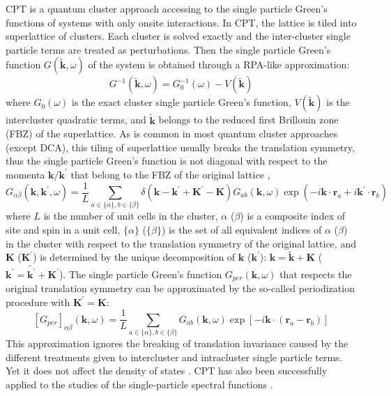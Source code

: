 \documentclass[12pt]{iopart}
\begin{document}
\par CPT \cite{SPP_PRL2000} is a quantum cluster approach accessing to the single particle Green's functions of systems with only onsite interactions. In CPT, the lattice is tiled into superlattice of clusters. Each cluster is solved exactly and the inter-cluster single particle terms are treated as perturbations. Then the single particle Green's function $G(\widetilde{\mathbf{k}},\omega)$ of the system is obtained through a RPA-like approximation:
\begin{equation}\label{SPGF}
  G^{-1}(\widetilde{\mathbf{k}},\omega)=G_0^{-1}(\omega)-V(\widetilde{\mathbf{k}})
\end{equation}
where $G_0(\omega)$ is the exact cluster single particle Green's function, $V(\widetilde{\mathbf{k}})$ is the intercluster quadratic terms, and $\widetilde{\mathbf{k}}$ belongs to the reduced first Brillouin zone (FBZ) of the superlattice. As is common in most quantum cluster approaches (except DCA), this tiling of superlattice usually breaks the translation symmetry, thus the single particle Green's function is not diagonal with respect to the momenta $\mathbf{k}$/$\mathbf{k}^\prime$ that belong to the FBZ of the original lattice \cite{S_arXiv2008},
\begin{equation}\label{FT}
G_{\alpha\beta}(\mathbf{k},\mathbf{k}^\prime,\omega)=\frac{1}{L}\sum_{a\in\{\alpha\},b\in\{\beta\}}
\delta(\mathbf{k}-\mathbf{k}^\prime+\mathbf{K}^\prime-\mathbf{K}) G_{ab}(\mathbf{k},\omega) \exp\left(-i\mathbf{k}\cdot\mathbf{r}_a+i\mathbf{k}^\prime\cdot\mathbf{r}_b\right)
\end{equation}
where $L$ is the number of unit cells in the cluster, $\alpha$ ($\beta$) is a composite index of site and spin in a unit cell, $\{\alpha\}$ ($\{\beta\}$) is the set of all equivalent indices of $\alpha$ ($\beta$) in the cluster with respect to the translation symmetry of the original lattice, and $\mathbf{K}$ ($\mathbf{K}^\prime$) is determined by the unique decomposition of $\mathbf{k}$ ($\mathbf{k}^\prime$): $\mathbf{k}=\widetilde{\mathbf{k}}+\mathbf{K}$ ($\mathbf{k}^\prime=\widetilde{\mathbf{k}^\prime}+\mathbf{K}^\prime$). The single particle Green's function $G_{per}(\mathbf{k},\omega)$ that respects the original translation symmetry can be approximated by the so-called periodization procedure with $\mathbf{K}^\prime=\mathbf{K}$:
\begin{equation}\label{PP}
\left[G_{per}\right]_{\alpha\beta}(\mathbf{k},\omega)=
\frac{1}{L}\sum_{a\in\{\alpha\},b\in\{\beta\}}G_{ab}(\mathbf{k},\omega)\exp\left[-i \mathbf{k}\cdot(\mathbf{r}_a-\mathbf{r}_b)\right]
\end{equation}
This approximation ignores the breaking of translation invariance caused by the different treatments given to intercluster and intracluster single particle terms. Yet it does not affect the density of states \cite{S_arXiv2008}. CPT has also been successfully applied to the studies of the single-particle spectral functions \cite{SPP_PRL2000,ST_PRL2004,KYXL_PRB2011,YXL_PRL2011,YL_PRB2012,LYXL_PRB2014}.
\end{document}
